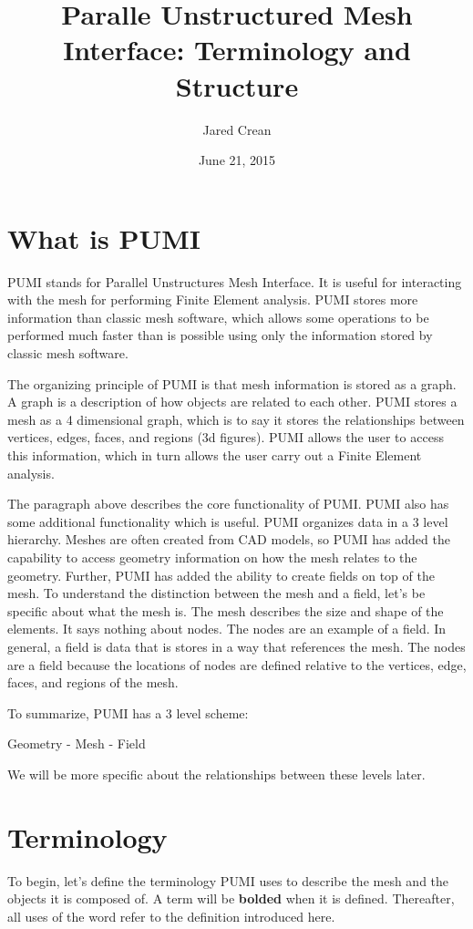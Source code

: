 \documentclass[12pt]{article}
\title{Paralle Unstructured Mesh Interface: Terminology and Structure}
\author{Jared Crean}
\date{June 21, 2015}
\begin{document}
\maketitle

\tableofcontents

\section{What is PUMI}
PUMI stands for Parallel Unstructures Mesh Interface.  It is useful for interacting with the mesh for performing Finite Element analysis.  PUMI stores more information than classic mesh software, which allows some operations to be performed much faster than is possible using only the information stored by classic mesh software.

The organizing principle of PUMI is that mesh information is stored as a graph.  A graph is a description of how objects are related to each other.  PUMI stores a mesh as a 4 dimensional graph, which is to say it stores the relationships between vertices, edges, faces, and regions (3d figures).  PUMI allows the user to access this information, which in turn allows the user carry out a Finite Element analysis.  

The paragraph above describes the core functionality of PUMI.  PUMI also has some additional functionality which is useful.  PUMI organizes data in a 3 level hierarchy. Meshes are often created from CAD models, so PUMI has added the capability to access geometry information on how the mesh relates to the geometry.  Further, PUMI has added the ability to create fields on top of the mesh.  To understand the distinction between the mesh and a field, let's be specific about what the mesh is.  The mesh describes the size and shape of the elements.  It says nothing about nodes.  The nodes are an example of a field.  In general, a field is data that is stores in a way that references the mesh.  The nodes are a field because the locations of nodes are defined relative to the vertices, edge, faces, and regions of the mesh.

To summarize, PUMI has a 3 level scheme:

Geometry - Mesh - Field

We will be more specific about the relationships between these levels later.


\section{Terminology}
To begin, let's define the terminology PUMI uses to describe the mesh and the objects it is composed of.  A term will be \textbf{bolded} when it is defined.  Thereafter, all uses of the word refer to the definition introduced here.
\end{document}
